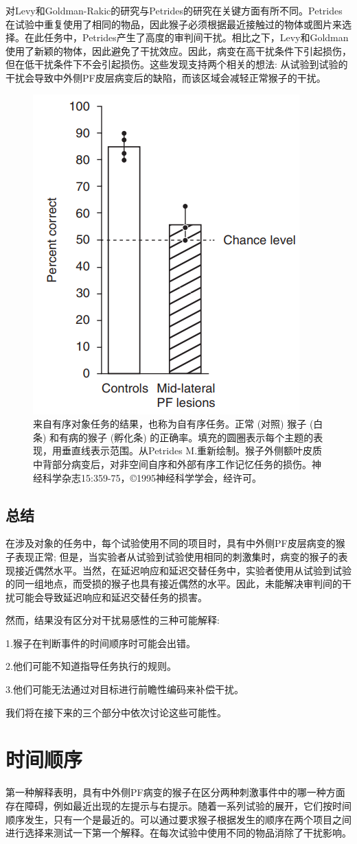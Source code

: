 对Levy和Goldman-Rakic的研究与Petrides的研究在关键方面有所不同。Petrides在试验中重复使用了相同的物品，因此猴子必须根据最近接触过的物体或图片来选择。在此任务中，Petrides产生了高度的审判间干扰。相比之下，Levy和Goldman使用了新颖的物体，因此避免了干扰效应。因此，病变在高干扰条件下引起损伤，但在低干扰条件下不会引起损伤。这些发现支持两个相关的想法: 从试验到试验的干扰会导致中外侧PF皮层病变后的缺陷，而该区域会减轻正常猴子的干扰。
\begin{figure}
	\centering
	\includegraphics[width=0.3\linewidth]{image_pfc/Fig_6_4}
	\caption{来自有序对象任务的结果，也称为自有序任务。正常 (对照) 猴子 (白条) 和有病的猴子 (孵化条) 的正确率。填充的圆圈表示每个主题的表现，用垂直线表示范围。从Petrides M.重新绘制。猴子外侧额叶皮质中背部分病变后，对非空间自序和外部有序工作记忆任务的损伤。神经科学杂志15:359-75，©1995神经科学学会，经许可。}
	\label{fig:fig}
\end{figure}
\subsection{总结}
在涉及对象的任务中，每个试验使用不同的项目时，具有中外侧PF皮层病变的猴子表现正常; 但是，当实验者从试验到试验使用相同的刺激集时，病变的猴子的表现接近偶然水平。当然，在延迟响应和延迟交替任务中，实验者使用从试验到试验的同一组地点，而受损的猴子也具有接近偶然的水平。因此，未能解决审判间的干扰可能会导致延迟响应和延迟交替任务的损害。

然而，结果没有区分对干扰易感性的三种可能解释:
\par
1.猴子在判断事件的时间顺序时可能会出错。
\par
2.他们可能不知道指导任务执行的规则。
\par
3.他们可能无法通过对目标进行前瞻性编码来补偿干扰。

我们将在接下来的三个部分中依次讨论这些可能性。

\section{时间顺序}
第一种解释表明，具有中外侧PF病变的猴子在区分两种刺激事件中的哪一种方面存在障碍，例如最近出现的左提示与右提示。随着一系列试验的展开，它们按时间顺序发生，只有一个是最近的。可以通过要求猴子根据发生的顺序在两个项目之间进行选择来测试一下第一个解释。在每次试验中使用不同的物品消除了干扰影响。

